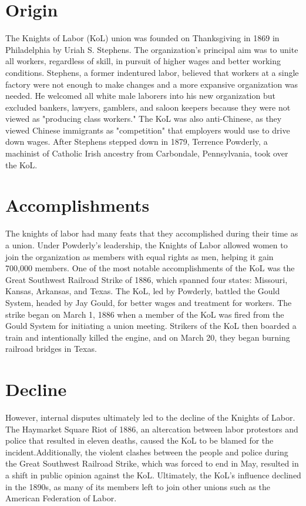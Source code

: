 \documentclass[a4paper, 12pt]{article}
\begin{document}
 
\section{Origin}
\hspace{\parindent} The Knights of Labor (KoL) union was founded on Thanksgiving in 1869 in Philadelphia by Uriah S. Stephens.\autocite{history.com} The organization's principal aim was to unite all workers, regardless of skill, in pursuit of higher wages and better working conditions. Stephens, a former indentured labor, believed that workers at a single factory were not enough to make changes and a more expansive organization was needed.\autocite{Foner1947} He welcomed all white male laborers into his new organization but excluded bankers, lawyers, gamblers, and saloon keepers because they were not viewed as "producing class workers."\autocite{Green1980} The KoL was also anti-Chinese,\autocite{history17b} as they viewed Chinese immigrants as "competition" that employers would use to drive down wages. After Stephens stepped down in 1879, Terrence Powderly, a machinist of Catholic Irish ancestry from Carbondale, Pennsylvania, took over the KoL.
\section{Accomplishments}
\hspace{\parindent} The knights of labor had many feats that they accomplished during their time as a union. Under Powderly's leadership, the Knights of Labor allowed women to join the organization as members with equal rights as men, helping it gain 700,000 members. One of the most notable accomplishments of the KoL was the Great Southwest Railroad Strike of 1886, which spanned four states: Missouri, Kansas, Arkansas, and Texas. The KoL, led by Powderly, battled the Gould System,\autocite{afl} headed by Jay Gould, for better wages and treatment for workers. The strike began on March 1, 1886 when a member of the KoL was fired from the Gould System for initiating a union meeting. Strikers of the KoL then boarded a train and intentionally killed the engine, and on March 20, they began burning railroad bridges in Texas.\autocite{RAILROAD1886}
\section{Decline}
\hspace{\parindent} However, internal disputes ultimately led to the decline of the Knights of Labor. The Haymarket Square Riot of 1886, an altercation between labor protestors and police that resulted in eleven deaths,\autocite{britannica} caused the KoL to be blamed for the incident.Additionally, the violent clashes between the people and police during the Great Southwest Railroad Strike, which was forced to end in May, resulted in a shift in public opinion against the KoL. Ultimately, the KoL's influence declined in the 1890s, as many of its members left to join other unions such as the American Federation of Labor.\autocite{Montgomery1987}
\end{document}
